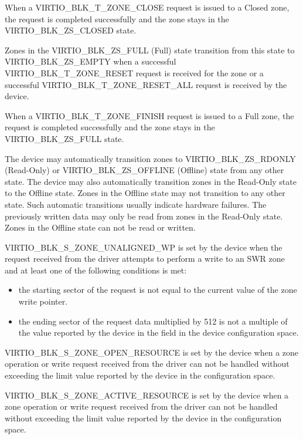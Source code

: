 When a VIRTIO_BLK_T_ZONE_CLOSE request is issued to a Closed zone, the request
is completed successfully and the zone stays in the VIRTIO_BLK_ZS_CLOSED state.

Zones in the VIRTIO_BLK_ZS_FULL (Full) state transition from this state to
VIRTIO_BLK_ZS_EMPTY when a successful VIRTIO_BLK_T_ZONE_RESET request is
received for the zone or a successful VIRTIO_BLK_T_ZONE_RESET_ALL request is
received by the device.

When a VIRTIO_BLK_T_ZONE_FINISH request is issued to a Full zone, the request
is completed successfully and the zone stays in the VIRTIO_BLK_ZS_FULL state.

The device may automatically transition zones to VIRTIO_BLK_ZS_RDONLY
(Read-Only) or VIRTIO_BLK_ZS_OFFLINE (Offline) state from any other state. The
device may also automatically transition zones in the Read-Only state to the
Offline state. Zones in the Offline state may not transition to any other state.
Such automatic transitions usually indicate hardware failures. The previously
written data may only be read from zones in the Read-Only state. Zones in the
Offline state can not be read or written.

VIRTIO_BLK_S_ZONE_UNALIGNED_WP is set by the device when the request received
from the driver attempts to perform a write to an SWR zone and at least one of
the following conditions is met:

\begin{itemize}
\item the starting sector of the request is not equal to the current value of
    the zone write pointer.

\item the ending sector of the request data multiplied by 512 is not a multiple
    of the value reported by the device in the field 
    in the device configuration space.
\end{itemize}

VIRTIO_BLK_S_ZONE_OPEN_RESOURCE is set by the device when a zone operation or
write request received from the driver can not be handled without exceeding the
 limit value reported by the device in the configuration
space.

VIRTIO_BLK_S_ZONE_ACTIVE_RESOURCE is set by the device when a zone operation or
write request received from the driver can not be handled without exceeding the
 limit value reported by the device in the configuration
space.

